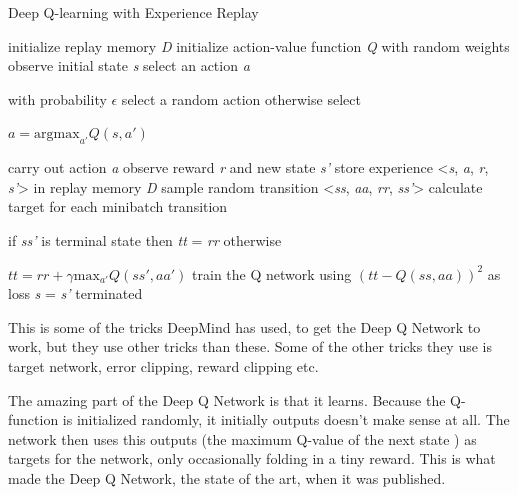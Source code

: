 \begin{algorithm}
	\caption{Deep Q-learning with Experience Replay \label{euclid}}
	\label{algo:DQN}
	\begin{algorithmic}[]
		\State initialize replay memory \textit{D}
		\State initialize action-value function \textit{Q} with random weights
		\State observe initial state \textit{s} 
		\Repeat
			\State select an action \textit{a}
				\par with probability $\epsilon$ select a random action otherwise select 
				\par $a = \mathrm{argmax}_{a'}Q(s,a')$
		
			\State carry out action \textit{a}
			\State observe reward \textit{r} and new state \textit{s'}
			\State store experience <\textit{s}, \textit{a}, \textit{r}, \textit{s'}> in replay memory \textit{D}
			\newline
			\State sample random transition <\textit{ss}, \textit{aa}, \textit{rr}, \textit{ss'}>      
			\State calculate target for each minibatch transition
				\par if \textit{ss'} is terminal state then \textit{tt} = \textit{rr} otherwise 
				\par $tt = rr + \gamma \mathrm{max}_{a'}Q(ss',aa')$
			\State train the Q network using $(\textit{tt} - Q(\textit{ss}, \textit{aa}))^2$ as loss	
			\newline
			\State \textit{s} = \textit{s'}
		\Until terminated
	\end{algorithmic}
\end{algorithm}

This is some of the tricks DeepMind has used, to get the Deep Q Network to work, but they use other tricks than these. Some of the other tricks they use is target network, error clipping, reward clipping etc. 

The amazing part of the Deep Q Network is that it learns. Because the Q-function is initialized randomly, it initially outputs doesn't make sense at all. The network then uses this outputs (the maximum Q-value of the next state ) as targets for the network, only occasionally folding in a tiny reward. This is what made the Deep Q Network, the state of the art, when it was published. \cite{DQN_theory} \cite{DQN_Flappy} 

        